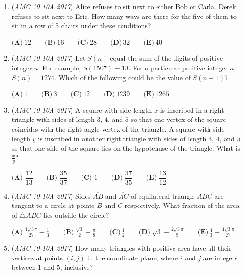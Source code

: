 \begin{enumerate}
 $\textbf{(A)}\ 1\qquad\textbf{(B)}\ 2\qquad\textbf{(C)}\ 3\qquad\textbf{(D)}\ 4\qquad\textbf{(E)}\ 5$


	\item (\textit{AMC 10 10A 2017}) Alice refuses to sit next to either Bob or Carla. Derek refuses to sit next to Eric. How many ways are there for the five of them to sit in a row of 5 chairs under these conditions?


 $\textbf{(A)}\ 12\qquad\textbf{(B)}\ 16\qquad\textbf{(C)}\ 28\qquad\textbf{(D)}\ 32\qquad\textbf{(E)}\ 40$


	\item (\textit{AMC 10 10A 2017}) Let $S(n)$ equal the sum of the digits of positive integer $n$. For example, $S(1507) = 13$. For a particular positive integer $n$, $S(n) = 1274$. Which of the following could be the value of $S(n+1)$?


 $\textbf{(A)}\ 1 \qquad\textbf{(B)}\ 3\qquad\textbf{(C)}\ 12\qquad\textbf{(D)}\ 1239\qquad\textbf{(E)}\ 1265$


	\item (\textit{AMC 10 10A 2017}) A square with side length $x$ is inscribed in a right triangle with sides of length $3$, $4$, and $5$ so that one vertex of the square coincides with the right-angle vertex of the triangle. A square with side length $y$ is inscribed in another right triangle with sides of length $3$, $4$, and $5$ so that one side of the square lies on the hypotenuse of the triangle. What is $\frac{x}{y}$?


 $\textbf{(A) } \dfrac{12}{13} \qquad \textbf{(B) } \dfrac{35}{37} \qquad \textbf{(C) } 1 \qquad \textbf{(D) } \dfrac{37}{35} \qquad \textbf{(E) } \dfrac{13}{12}$


	\item (\textit{AMC 10 10A 2017}) Sides $\overline{AB}$ and $\overline{AC}$ of equilateral triangle $ABC$ are tangent to a circle at points $B$ and $C$ respectively.  What fraction of the area of $\triangle ABC$ lies outside the circle?


 $\textbf{(A)}\ \frac{4\sqrt{3}\pi}{27}-\frac{1}{3}\qquad\textbf{(B)}\ \frac{\sqrt{3}}{2}-\frac{\pi}{8}\qquad\textbf{(C)}\ \frac{1}{2}\qquad\textbf{(D)}\ \sqrt{3}-\frac{2\sqrt{3}\pi}{9}\qquad\textbf{(E)}\ \frac{4}{3}-\frac{4\sqrt{3}\pi}{27}$


	\item (\textit{AMC 10 10A 2017}) How many triangles with positive area have all their vertices at points $(i,j)$ in the coordinate plane, where $i$ and $j$ are integers between $1$ and $5$, inclusive?



\end{enumerate}
